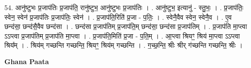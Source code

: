 \documentclass[17pt]{extarticle}
\begin{document}
54. आनु॑ष्टुभः प्र॒जाप॑तिः प्र॒जाप॑ति॒ रानु॑ष्टुभ॒ आनु॑ष्टुभः प्र॒जाप॑तिः । . आनु॑ष्टुभ॒ इत्यानु॑ - स्तु॒भः॒ । . प्र॒जाप॑तिः॒ स्वेन॒ स्वेन॑ प्र॒जाप॑तिः प्र॒जाप॑तिः॒ स्वेन॑ । . प्र॒जाप॑ति॒रिति॑ प्र॒जा - प॒तिः॒ । . स्वेनै॒वैव स्वेन॒ स्वेनै॒व । . ए॒व छन्द॑सा॒ छन्द॑सै॒वैव छन्द॑सा । . छन्द॑सा प्र॒जाप॑तिम् प्र॒जाप॑ति॒म् छन्द॑सा॒ छन्द॑सा प्र॒जाप॑तिम् । . प्र॒जाप॑ति मा॒प्त्वा ऽऽप्त्वा प्र॒जाप॑तिम् प्र॒जाप॑ति मा॒प्त्वा । . प्र॒जाप॑ति॒मिति॑ प्र॒जा - प॒ति॒म् । . आ॒प्त्वा श्रियꣳ॒॒ श्रिय॑ मा॒प्त्वा ऽऽप्त्वा श्रिय᳚म् । . श्रिय॑म् गच्छन्ति गच्छन्ति॒ श्रियꣳ॒॒ श्रिय॑म् गच्छन्ति । . ग॒च्छ॒न्ति॒ श्रीः श्रीर् ग॑च्छन्ति गच्छन्ति॒ श्रीः । \newline

\textbf{Ghana Paata } \newline
\end{document}
